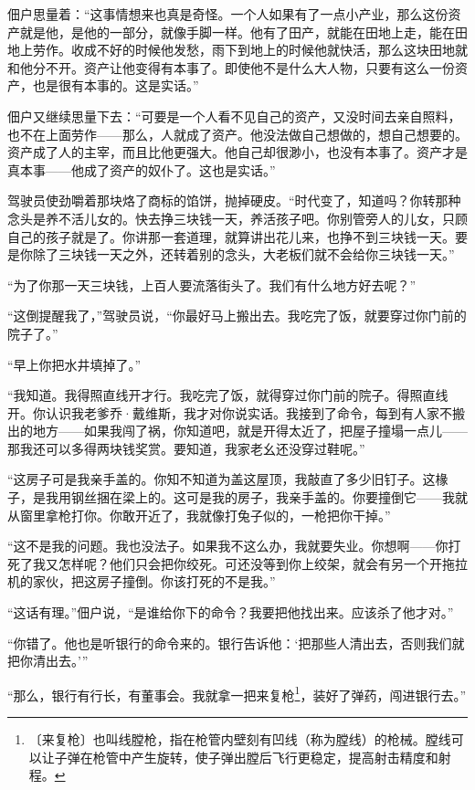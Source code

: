 \documentclass[12pt,UTF-8,openany]{ctexbook}
\begin{document}
\begin{normalsize}
    佃户思量着：“这事情想来也真是奇怪。一个人如果有了一点小产业，那么这份资产就是他，是他的一部分，就像手脚一样。他有了田产，就能在田地上走，能在田地上劳作。收成不好的时候他发愁，雨下到地上的时候他就快活，那么这块田地就和他分不开。资产让他变得有本事了。即使他不是什么大人物，只要有这么一份资产，也是很有本事的。这是实话。”
    
    佃户又继续思量下去：“可要是一个人看不见自己的资产，又没时间去亲自照料，也不在上面劳作——那么，人就成了资产。他没法做自己想做的，想自己想要的。资产成了人的主宰，而且比他更强大。他自己却很渺小，也没有本事了。资产才是真本事——他成了资产的奴仆了。这也是实话。”
    
    驾驶员使劲嚼着那块烙了商标的馅饼，抛掉硬皮。“时代变了，知道吗？你转那种念头是养不活儿女的。快去挣三块钱一天，养活孩子吧。你别管旁人的儿女，只顾自己的孩子就是了。你讲那一套道理，就算讲出花儿来，也挣不到三块钱一天。要是你除了三块钱一天之外，还转着别的念头，大老板们就不会给你三块钱一天。”
    
    “为了你那一天三块钱，上百人要流落街头了。我们有什么地方好去呢？”
    
    “这倒提醒我了，”驾驶员说，“你最好马上搬出去。我吃完了饭，就要穿过你门前的院子了。”
    
    “早上你把水井填掉了。”
    
    “我知道。我得照直线开才行。我吃完了饭，就得穿过你门前的院子。得照直线开。你认识我老爹乔·戴维斯，我才对你说实话。我接到了命令，每到有人家不搬出的地方——如果我闯了祸，你知道吧，就是开得太近了，把屋子撞塌一点儿——那我还可以多得两块钱奖赏。要知道，我家老幺还没穿过鞋呢。”
    
    “这房子可是我亲手盖的。你知不知道为盖这屋顶，我敲直了多少旧钉子。这椽子，是我用钢丝捆在梁上的。这可是我的房子，我亲手盖的。你要撞倒它——我就从窗里拿枪打你。你敢开近了，我就像打兔子似的，一枪把你干掉。”
    
    “这不是我的问题。我也没法子。如果我不这么办，我就要失业。你想啊——你打死了我又怎样呢？他们只会把你绞死。可还没等到你上绞架，就会有另一个开拖拉机的家伙，把这房子撞倒。你该打死的不是我。”
    
    “这话有理。”佃户说，“是谁给你下的命令？我要把他找出来。应该杀了他才对。”
    
    “你错了。他也是听银行的命令来的。银行告诉他：‘把那些人清出去，否则我们就把你清出去。’”
    
    “那么，银行有行长，有董事会。我就拿一把来复枪\footnote{〔来复枪〕也叫线膛枪，指在枪管内壁刻有凹线（称为膛线）的枪械。膛线可以让子弹在枪管中产生旋转，使子弹出膛后飞行更稳定，提高射击精度和射程。}，装好了弹药，闯进银行去。”
    

\end{normalsize}
\end{document}
